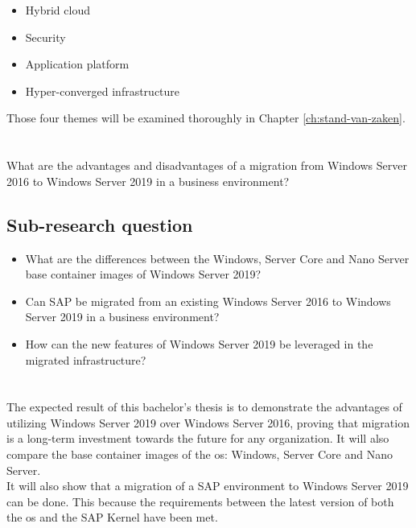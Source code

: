 \begin{itemize}
	\item Hybrid cloud
	\item Security
	\item Application platform
	\item Hyper-converged infrastructure
\end{itemize}

Those four themes will be examined thoroughly in Chapter \ref{ch:stand-van-zaken}.

\section{}
\label{sec:onderzoeksvraag}
What are the advantages and disadvantages of a migration from Windows Server 2016 to Windows Server 2019 in a business environment?

\subsection{Sub-research question}

\begin{itemize}
	\item What are the differences between the Windows, Server Core and Nano Server base container images of Windows Server 2019?
	\item Can SAP be migrated from an existing Windows Server 2016 to Windows Server 2019 in a business environment?
	\item How can the new features of Windows Server 2019 be leveraged in the migrated infrastructure? 
\end{itemize}

\section{}
\label{sec:onderzoeksdoelstelling}

The expected result of this bachelor's thesis is to demonstrate the advantages of utilizing Windows Server 2019 over Windows Server 2016, proving that migration is a long-term investment towards the future for any organization. 
It will also compare the base container images of the \acrshort{os}: Windows, Server Core and Nano Server. \\
It will also show that a migration of a SAP environment to Windows Server 2019 can be done. 
This because the  requirements between the latest version of both the \acrshort{os} and the SAP Kernel have been met. 

